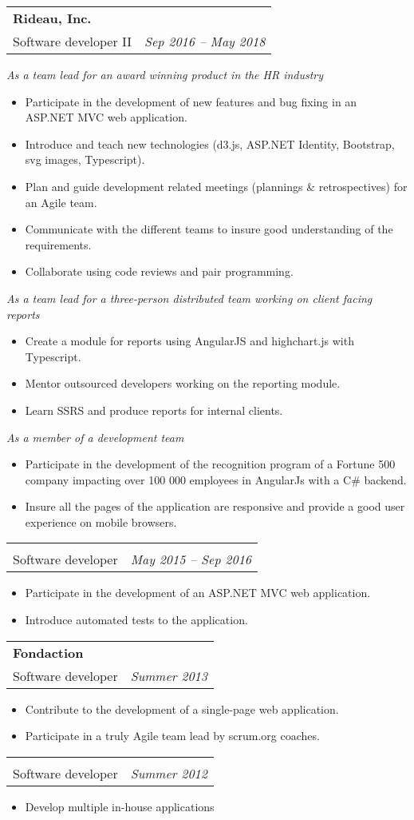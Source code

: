 \documentclass[letterpaper,11pt]{article}
\makeatletter
\newcommand{\resumeItem}[2]{
  \item\small{
    \textbf{#1}{ #2 \vspace{-1pt}}
  }
}
\newcommand{\resumeSubheading}[5]{
  \ifthenelse{\equal{#1}{}}{\vspace{-28pt}}{\vspace{-10pt}}\item
    \begin{tabular*}{0.96\textwidth}{l@{\extracolsep{\fill}}r}
      \textbf{#1} \\
      #2 \ifthenelse{\equal{#3}{}}{}{- \footnotesize{#3}} & \textit{\small #4} \\
    \end{tabular*} 
    \ifthenelse{\equal{#5}{0}}{\vspace{8pt}}{\noindent\rule{0.96\textwidth}{0.1pt}}
    \vspace{-20pt}
}
\newcommand{\resumeSubSubHeading}[1]{

    \vspace{3pt}
    \textit{\small #1}
    \vspace{-6pt}
}
\newcommand{\resumeItemListStart}{\begin{itemize}}
\newcommand{\resumeItemListEnd}{\end{itemize}\vspace{-5pt}}
\makeatother
\begin{document}
    \resumeSubheading
      {Rideau, Inc.}
      {Software developer II}{C\#, AngularJS, TypeScript, ASP.NET MVC, JavaScript, D3.js, SQL}{Sep 2016 -- May 2018}{} 
        \resumeSubSubHeading{As a team lead for an award winning product in the HR industry }
        \resumeItemListStart
            \resumeItem{}
              {Participate in the development of new features and bug fixing in an ASP.NET MVC web application.}
            \resumeItem{}
              {Introduce and teach new technologies (d3.js, ASP.NET Identity, Bootstrap, svg images, Typescript).}
            \resumeItem{}
              {Plan and guide development related meetings (plannings \& retrospectives) for an Agile team.}
            \resumeItem{}
              {Communicate with the different teams to insure good understanding of the requirements.}
            \resumeItem{}
              {Collaborate using code reviews and pair programming.}
        \resumeItemListEnd
        \resumeSubSubHeading{As a team lead for a three-person distributed team working on client facing reports}
        \resumeItemListStart
            \resumeItem{}
              {Create a module for reports using AngularJS and highchart.js with Typescript.}
            \resumeItem{}
              {Mentor outsourced developers working on the reporting module.}
            \resumeItem{}
              {Learn SSRS and produce reports for internal clients.}
        \resumeItemListEnd
        \resumeSubSubHeading{As a member of a development team}
        \resumeItemListStart
            \resumeItem{}
              {Participate in the development of the recognition program of a Fortune 500 company impacting over 100 000 employees in AngularJs with a C\# backend.}
            \resumeItem{}
              {Insure all the pages of the application are responsive and provide a good user experience on mobile browsers.}
        \resumeItemListEnd
      \resumeSubheading
      {}{Software developer}{C\#, ASP.NET MVC, Javascript, git, SQL Server}{May 2015 -- Sep 2016}{}
      \resumeItemListStart
        \resumeItem{}
          {Participate in the development of an ASP.NET MVC web application.}
        \resumeItem{}
          {Introduce automated tests to the application.}
      \resumeItemListEnd
      
    \resumeSubheading
      {Fondaction}
      {Software developer}{C\#, AngularJS, coffeescript, RESTFul APIs, TDD, Mercurial}{Summer 2013}{}
      \resumeItemListStart
        \resumeItem{}{Contribute to the development of a single-page web application.}
        \resumeItem{}{Participate in a truly Agile team lead by scrum.org coaches.}
      \resumeItemListEnd
    \resumeSubheading
      {}{Software developer}{VB.net, JavaScript, HTML, svn}{Summer 2012}{}
      \resumeItemListStart
        \resumeItem{}
          {Develop multiple in-house applications}
      \resumeItemListEnd
\end{document}
